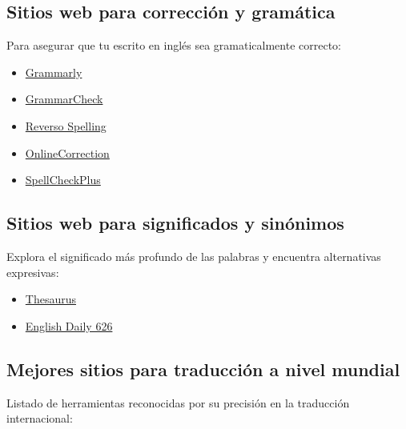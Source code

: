 \documentclass[
  jou,
  floatsintext,
  longtable,
  a4paper,
  nolmodern,
  notxfonts,
  notimes,
  colorlinks=true,linkcolor=blue,citecolor=blue,urlcolor=blue]{apa7}
\providecommand{\tightlist}{%
  \setlength{\itemsep}{0pt}\setlength{\parskip}{0pt}}
\begin{document}
\subsection{Sitios web para corrección y
gramática}\label{sitios-web-para-correcciuxf3n-y-gramuxe1tica}

Para asegurar que tu escrito en inglés sea gramaticalmente correcto:

\begin{itemize}
\tightlist
\item
  \href{https://www.grammarly.com/m}{Grammarly}
\item
  \href{https://www.grammarcheck.net/}{GrammarCheck}
\item
  \href{http://mobile.reverso.net/en}{Reverso Spelling}
\item
  \href{https://www.onlinecorrection.com/}{OnlineCorrection}
\item
  \href{https://spellcheckplus.com/}{SpellCheckPlus}
\end{itemize}

\subsection{Sitios web para significados y
sinónimos}\label{sitios-web-para-significados-y-sinuxf3nimos}

Explora el significado más profundo de las palabras y encuentra
alternativas expresivas:

\begin{itemize}
\tightlist
\item
  \href{https://www.thesaurus.com/}{Thesaurus}
\item
  \href{http://www.englishdaily626.com/}{English Daily 626}
\end{itemize}

\subsection{Mejores sitios para traducción a nivel
mundial}\label{mejores-sitios-para-traducciuxf3n-a-nivel-mundial}

Listado de herramientas reconocidas por su precisión en la traducción
internacional:
\end{document}
